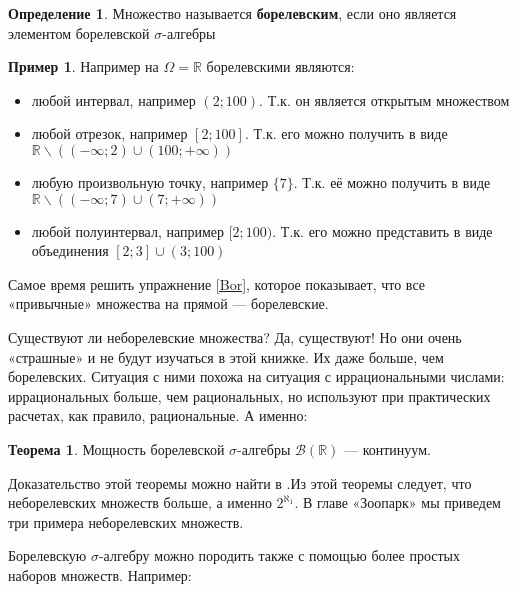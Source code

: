 \documentclass[pdftex, 12pt, a4paper]{article}
\theoremstyle{definition} %
\newtheorem*{mydef}{Определение}
\newtheorem{myex}{Пример}
\newtheorem{myth}{Теорема}
\numberwithin{problem}{section}
\newcommand{\indef}[1]{\textbf{#1}}
\numberwithin{blits}{section}
\begin{document}
\begin{mydef} Множество называется \indef{борелевским}, если оно является элементом борелевской $\sigma$-алгебры
\end{mydef}

\begin{myex} Например на $ \Omega=\mathbb{R} $ борелевскими являются:
\begin{itemize}
\item любой интервал, например $(2;100)$. Т.к. он является открытым множеством
\item любой отрезок, например $[2;100]$. Т.к. его можно получить в виде $\mathbb{R}\backslash((-\infty;2)\cup (100;+\infty))$
\item любую произвольную точку, например $\{7\}$. Т.к. её можно получить в виде $\mathbb{R}\backslash ((-\infty;7)\cup (7;+\infty))$
\item любой полуинтервал, например $[2;100)$. Т.к. его можно представить в виде объединения $[2;3] \cup (3;100)$
\end{itemize}
\end{myex}

Самое время решить упражнение \ref{Bor}, которое показывает, что все «привычные» множества на прямой --- борелевские.

Существуют ли неборелевские множества? Да, существуют! Но они очень «страшные» и не будут изучаться в этой книжке. Их даже больше, чем борелевских. Ситуация с ними похожа на ситуация с иррациональными числами: иррациональных больше, чем рациональных, но используют при практических расчетах, как правило, рациональные. А именно:

\begin{myth} Мощность борелевской $\sigma$-алгебры $\mathcal{B}(\mathbb{R})$ --- континуум.
\end{myth}

Доказательство этой теоремы можно найти в \cite{Shan:sets}.Из этой теоремы следует, что неборелевских множеств больше, а именно $2^{\aleph_1}$. В главе «Зоопарк» мы приведем три примера неборелевских множеств.

Борелевскую $\sigma$-алгебру можно породить также с помощью более простых наборов множеств. Например:
\end{document}
